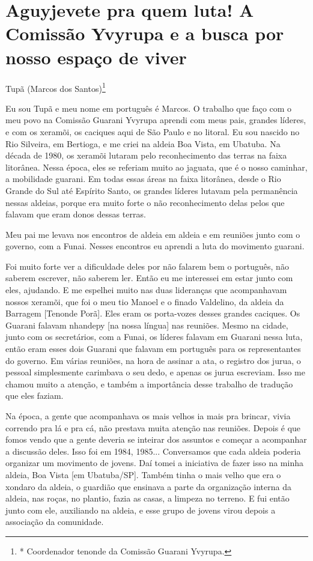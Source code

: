 \documentclass{article}
\begin{document}
\section[Aguyjevete pra quem luta! A Comiss\~ao Yvyrupa e a busca por
nosso espa\c{c}o de viver]{Aguyjevete pra quem luta! A Comiss\~ao
Yvyrupa e a busca por nosso espa\c{c}o de viver}
 Tup\~a (Marcos dos Santos)\footnote{* Coordenador tenonde da Comiss\~ao
Guarani Yvyrupa.}

Eu sou Tup\~a e meu nome em portugu\^es \'e Marcos. O trabalho que
fa\c{c}o com o meu povo na Comiss\~ao Guarani Yvyrupa aprendi com meus
pais, grandes l\'ideres, e com os xeram\~oi, os caciques aqui de S\~ao
Paulo e no litoral. Eu sou nascido no Rio Silveira, em Bertioga, e me
criei na aldeia Boa Vista, em Ubatuba. Na d\'ecada de 1980, os
xeram\~oi lutaram pelo reconhecimento das terras na faixa litor\^anea.
Nessa \'epoca, eles se referiam muito ao jaguata, que \'e o nosso
caminhar, a mobilidade guarani. Em todas essas \'areas na faixa
litor\^anea, desde o Rio Grande do Sul at\'e Esp\'irito Santo, os
grandes l\'ideres lutavam pela perman\^encia nessas aldeias, porque era
muito forte o n\~ao reconhecimento delas pelos que falavam que eram
donos dessas terras. 

Meu pai me levava nos encontros de aldeia em aldeia e em reuni\~oes
junto com o governo, com a Funai. Nesses encontros eu aprendi a luta do
movimento guarani. 

Foi muito forte ver a dificuldade deles por n\~ao falarem bem o
portugu\^es, n\~ao saberem escrever, n\~ao saberem ler. Ent\~ao eu me
interessei em estar junto com eles, ajudando. E me espelhei muito nas
duas lideran\c{c}as que acompanhavam nossos xeram\~oi, que foi o meu
tio Manoel e o finado Valdelino, da aldeia da Barragem [Tenonde
Por\~a]. Eles eram os porta-vozes desses grandes caciques. Os Guarani
falavam nhandepy [na nossa l\'ingua] nas reuni\~oes. Mesmo na cidade,
junto com os secret\'arios, com a Funai, os l\'ideres falavam em
Guarani nessa luta, ent\~ao eram esses dois Guarani que falavam em
portugu\^es para os representantes do governo. Em v\'arias reuni\~oes,
na hora de assinar a ata, o registro dos jurua, o pessoal simplesmente
carimbava o seu dedo, e apenas os jurua escreviam. Isso me chamou muito
a aten\c{c}\~ao, e tamb\'em a import\^ancia desse trabalho de
tradu\c{c}\~ao que eles faziam.

Na \'epoca, a gente que acompanhava os mais velhos ia mais pra brincar,
vivia correndo pra l\'a e pra c\'a, n\~ao prestava muita aten\c{c}\~ao
nas reuni\~oes. Depois \'e que fomos vendo que a gente deveria se
inteirar dos assuntos e come\c{c}ar a acompanhar a discuss\~ao deles.
Isso foi em 1984, 1985... Conversamos que cada aldeia poderia organizar
um movimento de jovens. Da\'i tomei a iniciativa de fazer isso na minha
aldeia, Boa Vista [em Ubatuba/SP]. Tamb\'em tinha o mais velho que era
o xondaro da aldeia, o guardi\~ao que ensinava a parte da
organiza\c{c}\~ao interna da aldeia, nas ro\c{c}as, no plantio, fazia
as casas, a limpeza no terreno. E fui ent\~ao junto com ele, auxiliando
na aldeia, e esse grupo de jovens virou depois a associa\c{c}\~ao da
comunidade.
\end{document}
